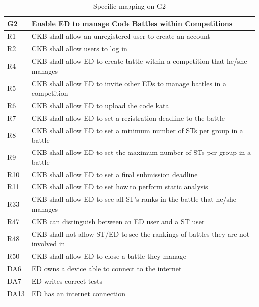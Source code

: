   \begin{longtable}{|l|p{12cm}| }
    \hline
    \textbf{G2} & \textbf{Enable ED to manage Code Battles within Competitions}      \\
    \hline
    R1 & CKB shall allow an unregistered user to create an account \\
    \hline
    R2 & CKB shall allow users to log in \\
    \hline
    R4 & CKB shall allow ED to create battle within a competition that he/she manages \\
    \hline
    R5 & CKB shall allow ED to invite other EDs to manage battles in a competition \\
    \hline
    R6 & CKB shall allow ED to upload the code kata \\
    \hline
    R7 & CKB shall allow ED to set a registration deadline to the battle \\
    \hline
    R8 & CKB shall allow ED to set a minimum number of STs per group in a battle \\
    \hline
    R9 & CKB shall allow ED to set the maximum number of STs per group in a battle \\
    \hline
    R10 & CKB shall allow ED to set a final submission deadline \\
    \hline
    R11 & CKB shall allow ED to set how to perform static analysis \\
    \hline
    R33 & CKB shall allow ED to see all ST’s ranks in the battle that he/she manages \\
    \hline
    R47 & CKB can distinguish between an ED user and a ST user \\
    \hline
    R48 & CKB shall not allow ST/ED to see the rankings of battles they are not involved in \\
    \hline
    R50 & CKB shall allow ED to close a battle they manage \\
    \hline
    DA6 & ED owns a device able to connect to the internet \\
    \hline
    DA7 & ED writes correct tests \\
    \hline
    DA13 & ED has an internet connection \\
    \hline

    \caption{Specific mapping on G2}
    \label{tab:mappingG2}
  \end{longtable}

  \pagebreak 



